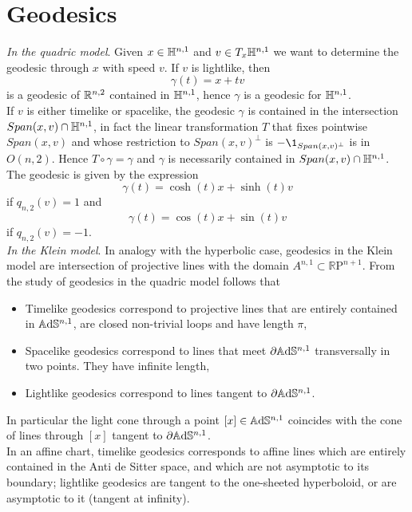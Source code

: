 \section{Geodesics}
\textit{In the quadric model}. Given $x\in \mathbb{H}^{n,1}$ and $v \in T_x \mathbb{H}^{n,1}$ we want to determine the geodesic through $x$ with speed $v$.
If $v$ is lightlike, then
\[
\gamma(t) = x + tv
\]
is a geodesic of $\mathbb{R}^{n,2}$ contained in $\mathbb{H}^{n,1}$, hence $\gamma$ is a geodesic for $\mathbb{H}^{n,1}$.\\
If $v$ is either timelike or spacelike, the geodesic $\gamma$ is contained in the intersection $Span(x,v) \cap \mathbb{H}^{n,1}$, in fact the linear transformation $T$ that fixes pointwise $Span(x,v)$ and whose restriction to $Span(x,v)^\perp$ is $-\1_{Span(x,v)^\perp}$ is in $O(n,2)$. Hence $T \circ \gamma = \gamma$ and $\gamma$ is necessarily contained in $Span(x,v) \cap \mathbb{H}^{n,1}$. The geodesic is given by the expression
\[
\gamma(t) = \cosh(t)x + \sinh(t)v
\]
if $q_{n,2}(v)= 1$ and 
\[
\gamma(t) = \cos(t)x + \sin(t)v
\] 
if $q_{n,2}(v)= -1$.\\

\textit{In the Klein model}. In analogy with the hyperbolic case, geodesics in the Klein model are intersection of projective lines with the domain $A^{n,1} \subset \mathbb{R}\text{P}^{n+1}$. From the study of geodesics in the quadric model follows that
\begin{itemize}
    \item Timelike geodesics correspond to projective lines that are entirely contained in $\mathbb{A}\mathrm{d}\mathbb{S}^{n,1}$, are closed non-trivial loops and have length $\pi$,
    \item Spacelike geodesics correspond to lines that meet $\partial\mathbb{A}\mathrm{d}\mathbb{S}^{n,1}$ transversally in two points. They have infinite length, 
    \item Lightlike geodesics correspond to lines tangent to $\partial\mathbb{A}\mathrm{d}\mathbb{S}^{n,1}$.
\end{itemize}
In particular the light cone through a point $\left[ x \right] \in \mathbb{A}\mathrm{d}\mathbb{S}^{n,1}$ coincides with the cone of lines through $\left[ x \right]$ tangent to $\partial \mathbb{A}\mathrm{d}\mathbb{S}^{n,1}$.\\
In an affine chart, timelike geodesics corresponds to affine lines which are entirely contained in the Anti de Sitter space, and which are not asymptotic to its boundary; lightlike geodesics are tangent to the one-sheeted hyperboloid, or are asymptotic to it (tangent at infinity).\\

